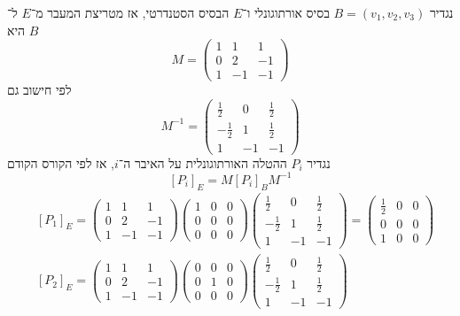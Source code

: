 נגדיר $B = (v_1, v_2, v_3)$ בסיס אורתוגונלי ו־$E$ הבסיס הסטנדרטי, אז מטריצת המעבר מ־$E$ ל־$B$ היא
\[
	M = \begin{pmatrix}
		1 & 1 & 1 \\
		0 & 2 & -1 \\
		1 & -1 & -1
	\end{pmatrix}
\]
לפי חישוב גם
\[
	M^{-1} = \begin{pmatrix}
		\frac{1}{2} & 0 & \frac{1}{2} \\
		-\frac{1}{2} & 1 & \frac{1}{2} \\
		1 & -1 & -1
	\end{pmatrix}
\]
נגדיר $P_i$ ההטלה האורתוגונלית על האיבר ה־$i$, אז לפי הקורס הקודם
\[
	[P_i]_E = M [P_i]_B M^{-1}
\]
\begin{align*}
	& [P_1]_E = 
	\begin{pmatrix}
		1 & 1 & 1 \\
		0 & 2 & -1 \\
		1 & -1 & -1
	\end{pmatrix}
	\begin{pmatrix}
		1 & 0 & 0 \\ 
		0 & 0 & 0 \\ 
		0 & 0 & 0
	\end{pmatrix}
	\begin{pmatrix}
		\frac{1}{2} & 0 & \frac{1}{2} \\
		-\frac{1}{2} & 1 & \frac{1}{2} \\
		1 & -1 & -1
	\end{pmatrix}
	= \begin{pmatrix}
		\frac{1}{2} & 0 & 0 \\
		0 & 0 & 0 \\
		1 & 0 & 0
	\end{pmatrix} \\
	& [P_2]_E = 
	\begin{pmatrix}
		1 & 1 & 1 \\
		0 & 2 & -1 \\
		1 & -1 & -1
	\end{pmatrix}
	\begin{pmatrix}
		0 & 0 & 0 \\ 
		0 & 1 & 0 \\ 
		0 & 0 & 0
	\end{pmatrix}
	\begin{pmatrix}
		\frac{1}{2} & 0 & \frac{1}{2} \\
		-\frac{1}{2} & 1 & \frac{1}{2} \\
		1 & -1 & -1
	\end{pmatrix}

\end{align*}
